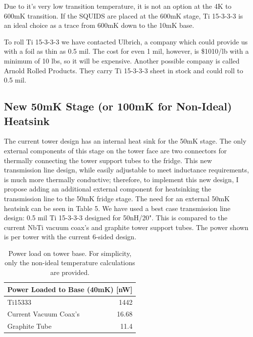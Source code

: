 \documentclass{report}
\begin{document}
Due to it's very low transition temperature, it is not an option at the 4K to 600mK transition. If the SQUIDS are placed at the 600mK stage, Ti 15-3-3-3 is an ideal choice as a trace from 600mK down to the 10mK base.

To roll Ti 15-3-3-3 we have contacted Ulbrich, a company which could provide us with a foil as thin as 0.5 mil. The cost for even 1 mil, however, is \$1010/lb with a minimum of 10 lbs, so it will be expensive. Another possible company is called Arnold Rolled Products. They carry Ti 15-3-3-3 sheet in stock and could roll to 0.5 mil.

\bigskip

\subsection{New 50mK Stage (or 100mK for Non-Ideal) Heatsink}
 The current tower design has an internal heat sink for the 50mK stage. The only external components of this stage on the tower face are two connectors for thermally connecting
the tower support tubes to the fridge. This new transmission line design, while easily adjustable to meet inductance requirements, is much more thermally conductive; therefore,
to implement this new design, I propose adding an additional external component for heatsinking the transmission line to the 50mK fridge stage. The need for an external 50mK
heatsink can be seen in Table 5. We have used a best case transmission line design: 0.5 mil Ti 15-3-3-3 designed for 50nH/20". This is compared to the current NbTi vacuum coax's and graphite tower support tubes. The power shown is per tower with the current 6-sided design.

\bigskip

\begin{table}
\centering
\begin{threeparttable}
\begin{tabular}{l|r}
\multicolumn{2}{c}{Power Loaded to Base (40mK) [nW]}\\\toprule
Ti15333 & 1442 \\\midrule
Current Vacuum Coax's & 16.68\\\midrule
Graphite Tube & 11.4 \\ \bottomrule
\end{tabular}
\end{threeparttable}
\caption{Power load on tower base. For simplicity, only the non-ideal temperature calculations are provided.}
\end{table}
\end{document}
